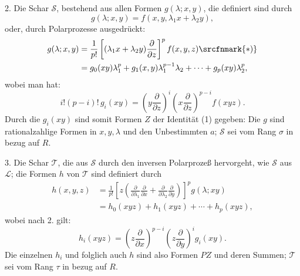 2. Die Schar $\mathcal S$, bestehend aus allen Formen $g(\lambda;x,y)$, die definiert sind durch
\[
  g(\lambda;x,y)=f(x,y,\lambda_1x+\lambda_2y),
\]
oder, durch Polarprozesse ausgedrückt:
\[
\begin{aligned}
  g(\lambda;x,y)
  &=\frac1{p!}\left[(\lambda_1x+\lambda_2y)\frac{\partial}{\partial z}\right]^p f(x,y,z)\srcfnmark{*)} \\
  &=g_0(xy)\lambda_1^p+g_1(x,y)\lambda_1^{p-1}\lambda_2+\cdots+g_p(xy)\lambda_2^p,
\end{aligned}
\]
wobei man hat:
\[
  i!(p-i)!\,g_i(xy)=
  \left(y\frac{\partial}{\partial z}\right)^i
  \left(x\frac{\partial}{\partial z}\right)^{p-i}f(xyz).
\]
Durch die $g_i(xy)$ sind somit Formen $Z$ der Identität (1) gegeben: Die $g$ sind rationalzahlige Formen in $x,y,\lambda$ und den Unbestimmten $a$; $\mathcal S$ sei vom Rang $\sigma$ in bezug auf $R$.

3. Die Schar $\mathcal T$, die aus $\mathcal S$ durch den inversen Polarprozeß hervorgeht, wie $\mathcal S$ aus $\mathcal L$; die Formen $h$ von $\mathcal T$ sind definiert durch
\[
\begin{aligned}
 h(x,y,z)
 &=\frac1{p!}\left[z\left(\frac{\partial}{\partial\lambda_1}\frac{\partial}{\partial x}
 +\frac{\partial}{\partial\lambda_2}\frac{\partial}{\partial y}\right)\right]^p g(\lambda;xy)\\
 &=h_0(xyz)+h_1(xyz)+\cdots+h_p(xyz),
\end{aligned}
\]
wobei nach 2. gilt:
\[
  h_i(xyz)=
  \left(z\frac{\partial}{\partial x}\right)^{p-i}
  \left(z\frac{\partial}{\partial y}\right)^i g_i(xy).
\]
Die einzelnen $h_i$ und folglich auch $h$ sind also Formen $PZ$ und deren Summen; $\mathcal T$ sei vom Rang $\tau$ in bezug auf $R$.

